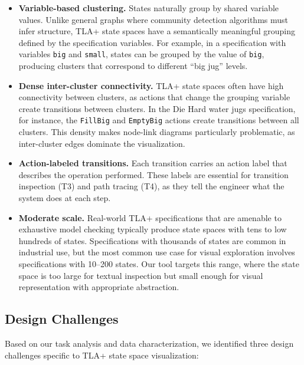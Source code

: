 \documentclass[conference]{IEEEtran}
\begin{document}
\begin{itemize}
\item[\textbf{C1.}] \textbf{Variable-based clustering.} States naturally group by shared variable values. Unlike general graphs where community detection algorithms must infer structure, TLA+ state spaces have a semantically meaningful grouping defined by the specification variables. For example, in a specification with variables \texttt{big} and \texttt{small}, states can be grouped by the value of \texttt{big}, producing clusters that correspond to different ``big jug'' levels.

\item[\textbf{C2.}] \textbf{Dense inter-cluster connectivity.} TLA+ state spaces often have high connectivity between clusters, as actions that change the grouping variable create transitions between clusters. In the Die Hard water jugs specification, for instance, the \texttt{FillBig} and \texttt{EmptyBig} actions create transitions between all clusters. This density makes node-link diagrams particularly problematic, as inter-cluster edges dominate the visualization.

\item[\textbf{C3.}] \textbf{Action-labeled transitions.} Each transition carries an action label that describes the operation performed. These labels are essential for transition inspection (T3) and path tracing (T4), as they tell the engineer what the system does at each step.

\item[\textbf{C4.}] \textbf{Moderate scale.} Real-world TLA+ specifications that are amenable to exhaustive model checking typically produce state spaces with tens to low hundreds of states. Specifications with thousands of states are common in industrial use, but the most common use case for visual exploration involves specifications with 10--200 states. Our tool targets this range, where the state space is too large for textual inspection but small enough for visual representation with appropriate abstraction.
\end{itemize}

\subsection{Design Challenges}

Based on our task analysis and data characterization, we identified three design challenges specific to TLA+ state space visualization:
\end{document}
